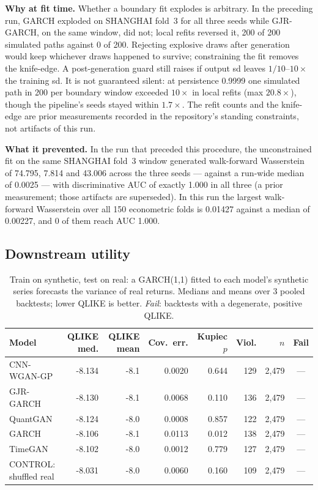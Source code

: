 \documentclass[11pt,a4paper]{article}
\makeatletter
\DeclareRobustCommand{\_}{\ifmmode\nfss@text{\textunderscore}\else\textunderscore\allowbreak\fi}
\makeatother
\begin{document}
\smallskip
\textbf{Why at fit time.} Whether a boundary fit explodes is arbitrary. In the preceding run, GARCH exploded on SHANGHAI fold~3 for all three seeds while GJR-GARCH, on the same window, did not; local refits reversed it, 200 of 200 simulated paths against 0 of 200. Rejecting explosive draws after generation would keep whichever draws happened to survive; constraining the fit removes the knife-edge. A post-generation guard still raises if output sd leaves $1/10$--$10\times$ the training sd. It is not guaranteed silent: at persistence 0.9999 one simulated path in 200 per boundary window exceeded $10\times$ in local refits (max $20.8\times$), though the pipeline's seeds stayed within $1.7\times$. The refit counts and the knife-edge are prior measurements recorded in the repository's standing constraints, not artifacts of this run.

\smallskip
\textbf{What it prevented.} In the run that preceded this procedure, the unconstrained fit on the same SHANGHAI fold~3 window generated walk-forward Wasserstein of 74.795, 7.814 and 43.006 across the three seeds --- against a run-wide median of 0.0025 --- with discriminative AUC of exactly 1.000 in all three (a prior measurement; those artifacts are superseded). In this run the largest walk-forward Wasserstein over all 150 econometric folds is 0.01427 against a median of 0.00227, and 0 of them reach AUC 1.000.

\subsection{Downstream utility}
\label{sec:downstream}

\begin{table}[htbp]
\centering
\caption{Train on synthetic, test on real: a GARCH(1,1) fitted to each model's synthetic series forecasts the variance of real returns. Medians and means over 3 pooled backtests; lower QLIKE is better. \emph{Fail}: backtests with a degenerate, positive QLIKE.}
\label{tab:downstream}
\begin{tabular}{@{}lrrrrrrc@{}}
\toprule
Model & QLIKE med. & QLIKE mean & Cov.\ err. & Kupiec $p$ & Viol. & $n$ & Fail \\
\midrule
CNN-WGAN-GP & -8.134 & -8.1 & 0.0020 & 0.644 & 129 & 2,479 & --- \\
GJR-GARCH & -8.130 & -8.1 & 0.0068 & 0.110 & 136 & 2,479 & --- \\
QuantGAN & -8.124 & -8.0 & 0.0008 & 0.857 & 122 & 2,479 & --- \\
GARCH & -8.106 & -8.1 & 0.0113 & 0.012 & 138 & 2,479 & --- \\
TimeGAN & -8.102 & -8.0 & 0.0012 & 0.779 & 127 & 2,479 & --- \\
CONTROL: shuffled real & -8.031 & -8.0 & 0.0060 & 0.160 & 109 & 2,479 & --- \\
\bottomrule
\end{tabular}
\end{table}
\end{document}
